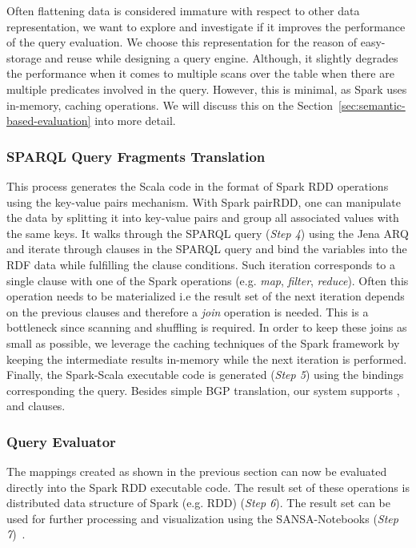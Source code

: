 Often flattening data is considered immature with respect to other data representation, we want to explore and investigate if it improves the performance of the query evaluation.
We choose this representation for the reason of easy-storage and reuse while designing a query engine. 
Although, it slightly degrades the performance when it comes to multiple scans over the table when there are multiple predicates involved in the query. However, this is minimal, as Spark uses in-memory, caching operations.
We will discuss this on the Section~\ref{sec:semantic-based-evaluation} into more detail.

\subsubsection{SPARQL Query Fragments Translation}
This process generates the Scala code in the format of Spark \gls{RDD} operations using the key-value pairs mechanism.
With Spark pairRDD, one can manipulate the data by splitting it into key-value pairs and group all associated values with the same keys. 
It walks through the \gls{SPARQL} query (\textit{Step 4}) using the Jena ARQ and iterate through clauses in the \gls{SPARQL} query and bind the variables into the \gls{RDF} data while fulfilling the clause conditions.
Such iteration corresponds to a single clause with one of the Spark operations (e.g. \emph{map}, \emph{filter}, \emph{reduce}).
Often this operation needs to be materialized i.e the result set of the next iteration depends on the previous clauses and therefore a \emph{join} operation is needed.
This is a bottleneck since scanning and shuffling is required.
In order to keep these joins as small as possible, we leverage the caching techniques of the Spark framework by keeping the intermediate results in-memory while the next iteration is performed.
Finally, the Spark-Scala executable code is generated (\textit{Step 5}) using the bindings corresponding the query.
Besides simple \gls{BGP} translation, our system supports ,  and  clauses.

\subsubsection{Query Evaluator}
The mappings created as shown in the previous section can now be evaluated directly into the Spark \gls{RDD} executable code.
The result set of these operations is distributed data structure of Spark (e.g. \gls{RDD}) (\textit{Step 6}).
The result set can be used for further processing and visualization using the SANSA-Notebooks (\textit{Step 7})~\cite{iermilov-2017-sansa-iswc-demo}.


